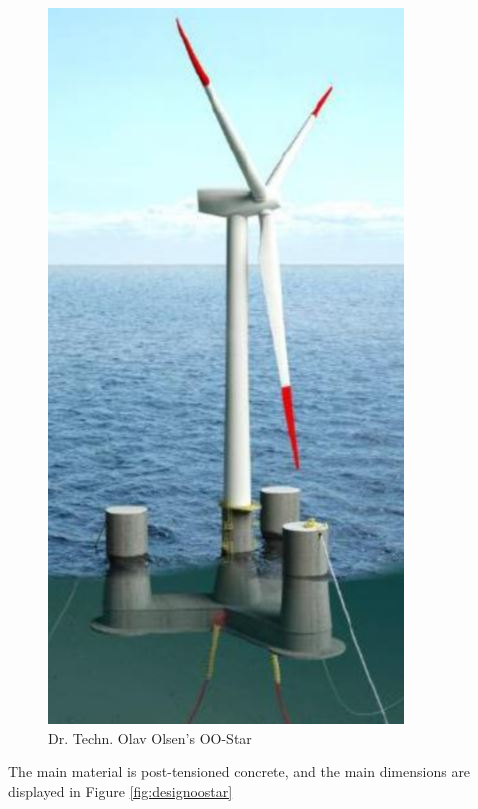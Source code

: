 \begin{figure}[H]
\centering
\includegraphics[scale=0.6]{figures/oostar}
\caption[$\; \:$Dr. Techn. Olav Olsen's OO-Star]{Dr. Techn. Olav Olsen's OO-Star \cite{Lifes50+D4.2} }
 \label{fig:oostar}
\end{figure}

\noindent The main material is post-tensioned concrete, and the main dimensions are displayed in Figure \ref{fig:designoostar}

